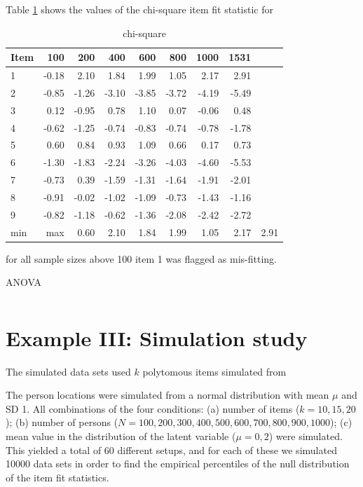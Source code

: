 \documentclass{article}
\begin{document}
Table \ref{chi} shows the values of the chi-square item fit statistic for
\begin{table}[]
\caption{{chi-square}}
\label{chi}
\begin{center}
\begin{tabular}{lrrrrrrrr}\hline\hline
Item&100 &200 &400 &600 &800 &1000 &1531\\\hline
1   &-0.18 & 2.10 & 1.84 & 1.99 & 1.05 & 2.17 & 2.91\\
2   &-0.85 &-1.26 &-3.10 &-3.85 &-3.72 &-4.19 &-5.49\\
3   & 0.12 &-0.95 & 0.78 & 1.10 & 0.07 &-0.06 & 0.48\\
4   &-0.62 &-1.25 &-0.74 &-0.83 &-0.74 &-0.78 &-1.78\\
5   & 0.60 & 0.84 & 0.93 & 1.09 & 0.66 & 0.17 & 0.73\\
6   &-1.30 &-1.83 &-2.24 &-3.26 &-4.03 &-4.60 &-5.53\\
7   &-0.73 & 0.39 &-1.59 &-1.31 &-1.64 &-1.91 &-2.01\\
8   &-0.91 &-0.02 &-1.02 &-1.09 &-0.73 &-1.43 &-1.16\\
9   &-0.82 &-1.18 &-0.62 &-1.36 &-2.08 &-2.42 &-2.72\\\hline
min &
max & 0.60 & 2.10 & 1.84 & 1.99 & 1.05 & 2.17 & 2.91\\
\hline\hline
\end{tabular}
\end{center}
\end{table}

for all sample sizes above 100 item 1 was flagged as mis-fitting.
\begin{table}[]
\caption{{ANOVA}}
\label{ANOVA}
\begin{center}
\begin{tabular}{lrrrrrrr}\hline\hline

\end{tabular}
\end{center}
\end{table}


\section{Example III: Simulation study}
The simulated data sets used $k$ polytomous items simulated from

The person locations were simulated from a normal distribution with mean $\mu$ and SD 1. All combinations of the four conditions: (a) number of items ($k=10,15,20$); (b) number of persons ($N=100,200,300,400,500,600,700,800,900,1000$); (c) mean value in the distribution of the latent variable ($\mu=0,2$) were simulated. This yielded a total of 60 different setups, and for each of these we simulated 10000 data sets in order to find the empirical percentiles of the null distribution of the item fit statistics.
\end{document}
